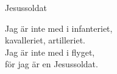 \begin{song}{Jesussoldat}

    	
	Jag är inte med i infanteriet,\\
	kavalleriet, artilleriet.\\
	Jag är inte med i flyget,\\
	för jag är en Jesussoldat.
	
\end{song}
